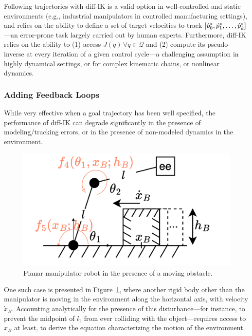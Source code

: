 Following trajectories with diff-IK is a valid option in well-controlled and static environments (e.g., industrial manipulators in controlled manufacturing settings), and relies on the ability to define a set of target velocities to track \( [\dot {p}^*_0, \dot {p}^*_1, \dots, \dot {p}^*_k ] \)---an error-prone task largely carried out by human experts.
Furthermore, diff-IK relies on the ability to (1) access \( J(q) \, \forall q \in \mathcal Q \) and (2) compute its pseudo-inverse at every iteration of a given control cycle---a challenging assumption in highly dynamical settings, or for complex kinematic chains, or nonlinear dynamics.

\subsubsection{Adding Feedback Loops}
While very effective when a goal trajectory has been well specified, the performance of diff-IK can degrade significantly in the presence of modeling/tracking errors, or in the presence of non-modeled dynamics in the environment.

\begin{figure}
    \vspace{-\intextsep}
    \centering
    \includegraphics[width=\linewidth]{figures/ch2/ch2-planar-manipulator-floor-box.png}
    \caption{Planar manipulator robot in the presence of a moving obstacle.}
    \label{fig:planar-manipulator-box-velocity}
\end{figure}

One such case is presented in Figure~\ref{fig:planar-manipulator-box-velocity}, where another rigid body other than the manipulator is moving in the environment along the horizontal axis, with velocity \( \dot x_B \).
Accounting analytically for the presence of this disturbance---for instance, to prevent the midpoint of \( l_1 \) from ever colliding with the object---requires access to \( \dot x_B \) at least, to derive the equation characterizing the motion of the environment.

